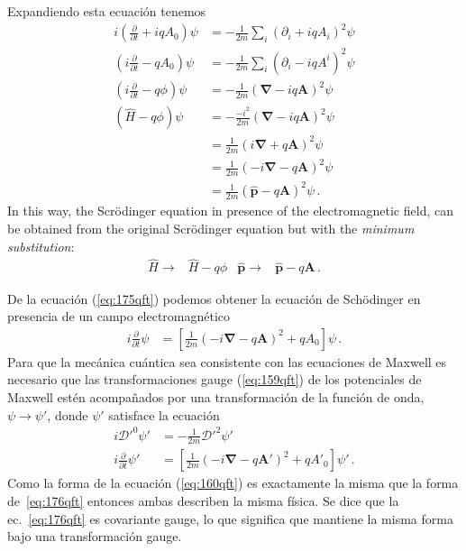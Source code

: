 Expandiendo esta ecuación tenemos 
\begin{align}
\label{eq:175qft}
   i\left(\frac{\partial}{\partial t}+iqA_0\right)\psi
&=-\frac{1}{2m}\sum_i(\partial_i+i q A_i)^2\psi\nonumber\\
   \left(i\frac{\partial}{\partial t}-qA_0\right)\psi
 &=-\frac{1}{2m}\sum_i(\partial_i-i q A^i)^2\psi\nonumber\\
   \left(i\frac{\partial}{\partial t}-q\phi\right)\psi
&=-\frac{1}{2m}(\boldsymbol{\nabla}-i q \mathbf{A})^2\psi\nonumber\\
   \left(\widehat{H}-q\phi\right)\psi
&=-\frac{-i^2}{2m}(\boldsymbol{\nabla}-i q \mathbf{A})^2\psi\nonumber\\
&=\frac{1}{2m}(i\boldsymbol{\nabla}+ q \mathbf{A})^2\psi\nonumber\\
&=\frac{1}{2m}(-i\boldsymbol{\nabla}- q \mathbf{A})^2\psi\nonumber\\
&=\frac{1}{2m}(\widehat{\mathbf{p}}- q \mathbf{A})^2\psi\,.
\end{align}
In this way, the Scrödinger equation in presence of the electromagnetic field, can be obtained from the original Scrödinger equation but with the \emph{minimum substitution}:
\begin{align}
  \widehat{H}\to& \widehat{H}-q\phi & \widehat{\mathbf{p}}\to&\widehat{\mathbf{p}}-q\mathbf{A}\,.
\end{align}



De la ecuación (\ref{eq:175qft}) podemos obtener la ecuación de Schödinger en presencia de un campo electromagnético
\begin{align}
\label{eq:176qft}
 i\frac{\partial}{\partial t}\psi&=\left[\frac{1}{2m}(-i\mathbf{\nabla}-q\mathbf{A})^2+qA_0\right]\psi\,.
\end{align}
 Para que la mecánica cuántica sea consistente con las ecuaciones de Maxwell es necesario que las transformaciones gauge (\ref{eq:159qft}) de los potenciales de Maxwell estén acompañados por una transformación de la función de onda, $\psi\to\psi'$, donde $\psi'$ satisface la ecuación
\begin{align}
  \label{eq:160qft}
   i{\mathcal{D}'}^0\psi'&=-\frac{1}{2m}{\boldsymbol{\mathcal{D}}'}^2\psi'\nonumber\\
 i\frac{\partial}{\partial t}\psi'&=\left[\frac{1}{2m}(-i\mathbf{\nabla}-q\mathbf{A}')^2+q{A'}_0\right]\psi'\,.
\end{align}
Como la forma de la ecuación (\ref{eq:160qft}) es exactamente la misma que la forma de~\eqref{eq:176qft} entonces ambas describen la misma física. Se dice que  la ec.~\eqref{eq:176qft} es covariante gauge, lo que significa que mantiene la misma forma bajo una transformación gauge. 

